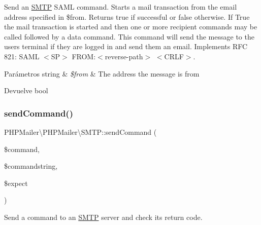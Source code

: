 Send an \hyperlink{classPHPMailer_1_1PHPMailer_1_1SMTP}{S\+M\+TP} S\+A\+ML command. Starts a mail transaction from the email address specified in \$from. Returns true if successful or false otherwise. If True the mail transaction is started and then one or more recipient commands may be called followed by a data command. This command will send the message to the users terminal if they are logged in and send them an email. Implements R\+FC 821\+: S\+A\+ML $<$\+S\+P$>$ F\+R\+OM\+:$<$reverse-\/path$>$ $<$\+C\+R\+L\+F$>$.


\begin{DoxyParams}[1]{Parámetros}
string & {\em \$from} & The address the message is from\\
\hline
\end{DoxyParams}
\begin{DoxyReturn}{Devuelve}
bool 
\end{DoxyReturn}
\mbox{\label{classPHPMailer_1_1PHPMailer_1_1SMTP_a53c91201465acb8cf92fbfd77f5b169a}} 
\subsubsection{\texorpdfstring{send\+Command()}{sendCommand()}}
{\footnotesize\ttfamily P\+H\+P\+Mailer\textbackslash{}\+P\+H\+P\+Mailer\textbackslash{}\+S\+M\+T\+P\+::send\+Command (\begin{DoxyParamCaption}\item[{}]{\$command,  }\item[{}]{\$commandstring,  }\item[{}]{\$expect }\end{DoxyParamCaption})\hspace{0.3cm}{\ttfamily [protected]}}

Send a command to an \hyperlink{classPHPMailer_1_1PHPMailer_1_1SMTP}{S\+M\+TP} server and check its return code.


